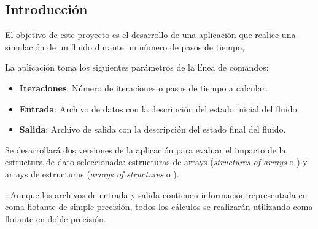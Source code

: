 \subsection{Introducción}

El objetivo de este proyecto es el desarrollo de una aplicación que realice una
simulación de un fluido durante un número de pasos de tiempo,

La aplicación toma los siguientes parámetros de la línea de comandos:

\begin{itemize}
\item \textbf{Iteraciones}: Número de iteraciones o pasos de tiempo a calcular.
\item \textbf{Entrada}: Archivo de datos con la descripción del estado inicial
del fluido.
\item \textbf{Salida}: Archivo de salida con la descripción del estado final del
fluido.
\end{itemize}

Se desarrollará dos versiones de la aplicación para evaluar el impacto de la
estructura de dato seleccionada: estructuras de arrays (\emph{structures of
arrays} o ) y arrays de estructuras (\emph{arrays of structures} o
).

: Aunque los archivos de entrada y salida contienen
información representada en coma flotante de simple precisión, todos los
cálculos se realizarán utilizando coma flotante en doble precisión.
